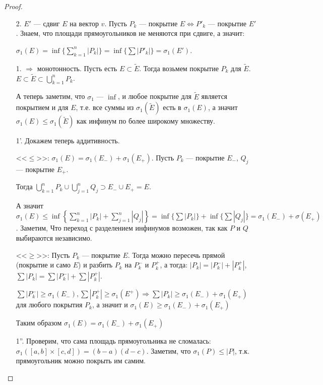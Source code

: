 \begin{proof}
    \slashn
    \begin{enumerate}
        \item[2.] $E'$ --- сдвиг  $E$ на вектор  $v$. Пусть  $P_k$ --- покрытие  $E \iff P'_k$ --- покрытие  $E'$. Знаем, что площади прямоугольников не меняются при сдвиге, а значит:
            
            $\sigma_1(E) = \inf\{\sum\limits_{k=1}^n|P_k|\} = \inf\{\sum |P'_k|\} = \sigma_1(E')$.
        \item[1.] $\Rightarrow$ монотонность. Пусть есть  $E \subset \widetilde{E}$. Тогда возьмем покрытие  $P_k$ для  $\widetilde{E}$.  $E \subset \widetilde{E} \subset \bigcup\limits_{k=1}^n P_k$. 

		А теперь заметим, что $\sigma_1$ ---  $\inf$, и любое покрытие для $\widetilde{E}$ является покрытием и для $E$, т.е. все суммы из $\sigma_1(\widetilde{E})$ есть в $\sigma_1(E)$, а значит $\sigma_1(E) \le \sigma_1(\widetilde{E})$ как инфинум по более широкому множеству. 

        \item[1'.] Докажем теперь аддитивность. 

            <<$\le$>>: $\sigma_1(E) = \sigma_1(E_-) + \sigma_1(E_+)$. Пусть $P_k$ --- покрытие  $E_-$,  $Q_j$ --- покрытие  $E_+$.
            
            Тогда $\bigcup\limits_{k=1}^n P_k \cup \bigcup\limits_{j=1}^n Q_j \supset E_- \cup E_+ = E$.
            
            А значит  $\sigma_1(E) \le \inf \left\{ \sum\limits_{k=1}^n |P_k| + \sum\limits_{j=1}^n |Q_j|\right\} = \inf\{\sum |P_k|\} + \inf\{\sum |Q_j|\} = \sigma_1(E_-) + \sigma(E_+)$. Заметим, Что переход с разделением инфинумов  возможен, так как $P$ и  $Q$ выбираются независимо.

	    <<$\ge$>>: Пусть $P_k$ --- покрытие  $E$. Тогда можно пересечь прямой (покрытие и само $E$) и разбить $P_k$ на $P_k^-$ и $P_k^+$, а тогда: $|P_k| = |P^-_k| + |P^+_k|$,  $\sum |P_k| = \sum |P^-_k| + \sum |P^+_k|$.
	    
	    $\sum |P_k^-| \ge \sigma_1(E_-), \sum |P_k^+| \ge \sigma_1(E^+) \Rightarrow \sum |P_k| \ge \sigma_1(E_-) + \sigma_1(E_+)$ для любого покрытия $P_k$, а значит и $\sigma_1(E) \ge \sigma_1(E_-) + \sigma_1(E_+)$

	    Таким образом $\sigma_1(E) = \sigma_1(E_-) + \sigma_1(E_+)$
        \item[1''.] Проверим, что сама площадь прямоугольника не сломалась: $\sigma_1([a, b] \times [c, d]) = (b-a)(d-c)$. Заметим, что  $\sigma_1(P) \le |P|$, т.к. прямоугольник можно покрыть им самим.


\end{enumerate}
\end{proof}
